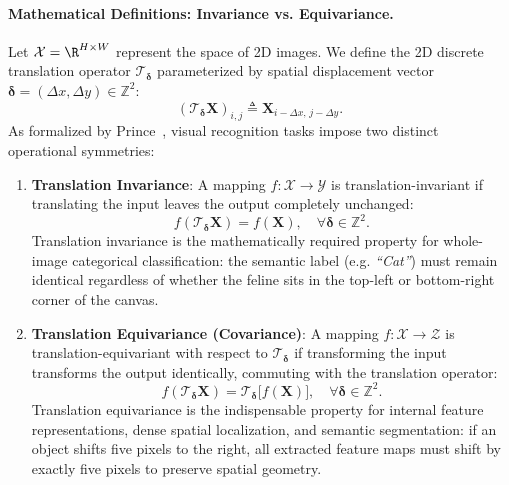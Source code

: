 \paragraph{Mathematical Definitions: Invariance vs. Equivariance.}
Let $\mathcal{X} = \R^{H \times W}$ represent the space of 2D images. We define the 2D discrete translation operator $\mathcal{T}_{\boldsymbol{\delta}}$ parameterized by spatial displacement vector $\boldsymbol{\delta} = (\Delta x, \Delta y) \in \mathbb{Z}^2$:
\begin{equation}
(\mathcal{T}_{\boldsymbol{\delta}} \mathbf{X})_{i, j} \triangleq \mathbf{X}_{i - \Delta x, \, j - \Delta y}.
\label{eq:translation_operator_def}
\end{equation}
As formalized by Prince~\cite{prince2023understanding}, visual recognition tasks impose two distinct operational symmetries:
\begin{enumerate}[leftmargin=*]
  \item \textbf{Translation Invariance}: A mapping $f: \mathcal{X} \to \mathcal{Y}$ is translation-invariant if translating the input leaves the output completely unchanged:
    \begin{equation}
    f\left( \mathcal{T}_{\boldsymbol{\delta}} \mathbf{X} \right) = f(\mathbf{X}), \quad \forall \boldsymbol{\delta} \in \mathbb{Z}^2.
    \label{eq:translation_invariance_math}
    \end{equation}
    Translation invariance is the mathematically required property for whole-image categorical classification: the semantic label (e.g. \textit{``Cat''}) must remain identical regardless of whether the feline sits in the top-left or bottom-right corner of the canvas.
  
  \item \textbf{Translation Equivariance (Covariance)}: A mapping $f: \mathcal{X} \to \mathcal{Z}$ is translation-equivariant with respect to $\mathcal{T}_{\boldsymbol{\delta}}$ if transforming the input transforms the output identically, commuting with the translation operator:
    \begin{equation}
    f\left( \mathcal{T}_{\boldsymbol{\delta}} \mathbf{X} \right) = \mathcal{T}_{\boldsymbol{\delta}} \big[ f(\mathbf{X}) \big], \quad \forall \boldsymbol{\delta} \in \mathbb{Z}^2.
    \label{eq:translation_equivariance_math}
    \end{equation}
    Translation equivariance is the indispensable property for internal feature representations, dense spatial localization, and semantic segmentation: if an object shifts five pixels to the right, all extracted feature maps must shift by exactly five pixels to preserve spatial geometry.
\end{enumerate}

